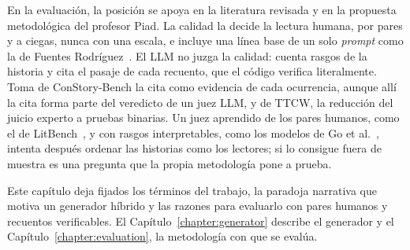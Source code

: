 En la evaluación, la posición se apoya en la literatura revisada y en la propuesta metodológica del profesor Piad. La calidad
la decide la lectura humana, por pares y a ciegas, nunca con una escala, e incluye una línea base de
un solo \textit{prompt} como la de Fuentes Rodríguez~\cite{fuentes2025}. El LLM no juzga la calidad: cuenta
rasgos de la historia y cita el pasaje de cada recuento, que el código verifica literalmente. Toma de
ConStory-Bench la cita como evidencia de cada ocurrencia, aunque allí la cita forma parte del
veredicto de un juez LLM, y de TTCW, la reducción del juicio experto a pruebas binarias. Un juez
aprendido de los pares humanos, como el de LitBench~\cite{fein2026}, y con rasgos interpretables, como
los modelos de Go et al.~\cite{go2024}, intenta después ordenar las historias como los lectores; si
lo consigue fuera de muestra es una pregunta que la propia metodología pone a prueba.

Este capítulo deja fijados los términos del trabajo, la paradoja narrativa que motiva un generador
híbrido y las razones para evaluarlo con pares humanos y recuentos verificables. El
Capítulo~\ref{chapter:generator} describe el generador y el Capítulo~\ref{chapter:evaluation}, la
metodología con que se evalúa.
